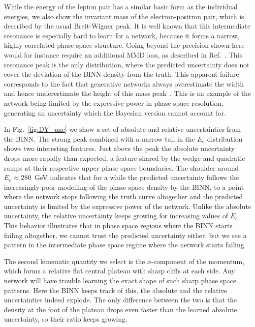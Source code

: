 While the energy of the lepton pair has a similar basic form as the
individual energies, we also show the invariant mass of the
electron-positron pair, which is described by the usual Breit-Wigner
peak. It is well known that this intermediate resonance is especially
hard to learn for a network, because it forms a narrow, highly
correlated phase space structure. Going beyond the precision shown
here would for instance require an additional MMD loss, as described
 in Ref.~\cite{fcgan}.
This resonance peak is the only distribution, where the predicted
uncertainty does not cover the deviation of the BINN density from the
truth. This apparent failure corresponds to the fact that generative
networks always overestimate the width and hence underestimate the
height of this mass peak~\cite{gan_phasespace}.  This is an example of
the network being limited by the expressive power in phase space
resolution, generating an uncertainty which the Bayesian version
cannot account for.

In Fig.~\ref{fig:DY_unc} we show a set of absolute and relative
uncertainties from the BINN. The strong peak combined with a narrow
tail in the $E_e$ distribution shows two interesting features. Just
above the peak the absolute uncertainty drops more rapidly than
expected, a feature shared by the wedge and quadratic ramps at their
respective upper phase space boundaries. The shoulder around $E_e
\approx 280$~GeV indicates that for a while the predicted uncertainty
follows the increasingly poor modelling of the phase space density by
the BINN, to a point where the network stops following the truth curve
altogether and the predicted uncertainty is limited by the expressive
power of the network.  Unlike the absolute uncertainty, the relative
uncertainty keeps growing for increasing values of $E_e$.  This
behavior illustrates that in phase space regions where the BINN starts
failing altogether, we cannot trust the predicted uncertainty either,
but we see a pattern in the intermediate phase space regime where the
network starts failing.

The second kinematic quantity we select is the
$x$-component of the momentum, which forms a relative flat central
plateau with sharp cliffs at each side. Any network will have trouble
learning the exact shape of such sharp phase space patterns. Here the
BINN keeps track of this, the absolute and the relative
uncertainties indeed explode. The only difference between the two is
that the density at the foot of the plateau drops even
faster than the learned absolute uncertainty, so their ratio keeps
growing.

